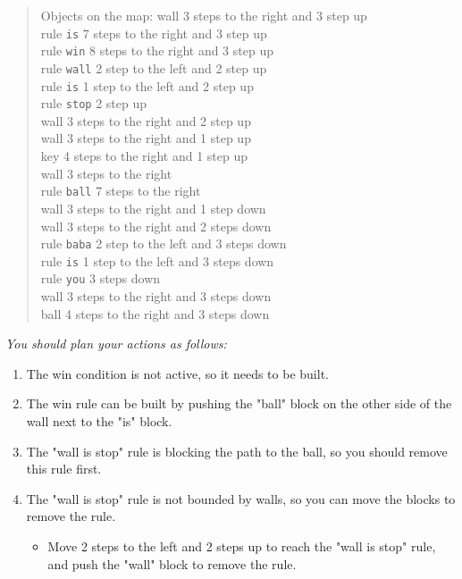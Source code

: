 \begin{GreenBox}
\begin{quote}
		Objects on the map: wall 3 steps to the right and 3 step up \\ rule \texttt{is}
		7 steps to the right and 3 step up \\ rule \texttt{win} 8 steps to the right
		and 3 step up \\ rule \texttt{wall} 2 step to the left and 2 step up \\ rule
		\texttt{is} 1 step to the left and 2 step up \\ rule \texttt{stop} 2 step up
		\\ wall 3 steps to the right and 2 step up \\ wall 3 steps to the right and 1
		step up \\ key 4 steps to the right and 1 step up \\ wall 3 steps to the right
		\\ rule \texttt{ball} 7 steps to the right \\ wall 3 steps to the right and
		1 step down \\ wall 3 steps to the right and 2 steps down \\ rule \texttt{baba}
		2 step to the left and 3 steps down \\ rule \texttt{is} 1 step to the left
		and 3 steps down \\ rule \texttt{you} 3 steps down \\ wall 3 steps to the right
		and 3 steps down \\ ball 4 steps to the right and 3 steps down\\
	\end{quote}

	\textit{You should plan your actions as follows:}
	\begin{enumerate}
		\item The win condition is not active, so it needs to be built.

		\item The win rule can be built by pushing the "ball" block on the other side
			of the wall next to the "is" block.

		\item The "wall is stop" rule is blocking the path to the ball, so you
			should remove this rule first.

		\item The "wall is stop" rule is not bounded by walls, so you can move the
			blocks to remove the rule.
			\begin{itemize}
				\item Move 2 steps to the left and 2 steps up to reach the "wall is stop"
					rule, and push the "wall" block to remove the rule.
			\end{itemize}


\end{enumerate}
\end{GreenBox}
